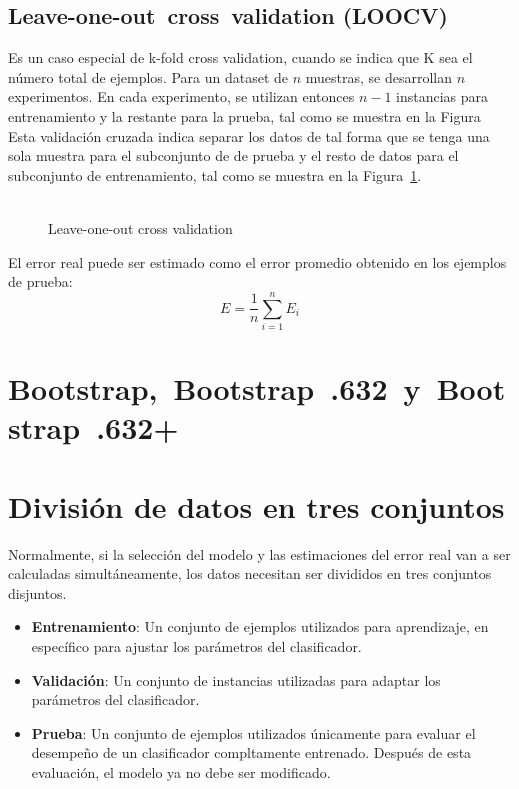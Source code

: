 \documentclass{article}
\begin{document}
\subsection{Leave-­one-out cross validation (LOOCV)}
Es un caso especial de k-fold cross validation, cuando se indica que K sea el número total de ejemplos.
Para un dataset de $n$ muestras, se desarrollan $n$ experimentos.
En cada experimento, se utilizan entonces $n-1$ instancias para entrenamiento y la restante para la prueba, tal como se muestra en la Figura 
Esta validación cruzada indica separar los datos de tal forma que se tenga una sola muestra para el subconjunto de de prueba y el resto de datos para el subconjunto de entrenamiento, tal como se muestra en la Figura~\ref{fig:leave-one-out-validation}.
\begin{figure}
	\centering
	\includegraphics[width=0.5]{resources/images/leave-one-out}
	\caption{Leave-one-out cross validation}
	\label{fig:leave-one-out-validation}
\end{figure}

El error real puede ser estimado como el error promedio obtenido en los ejemplos de prueba:
$$
	E = \frac{1}{n} \sum_{i=1}^n E_{i}
$$


\section{Bootstrap, Bootstrap .632 y Bootstrap .632+}

\section{División de datos en tres conjuntos}
Normalmente, si la selección del modelo y las estimaciones del error real van a ser calculadas simultáneamente, los datos necesitan ser divididos en tres conjuntos disjuntos.
\begin{itemize}
	\item \textbf{Entrenamiento}: Un conjunto de ejemplos utilizados para aprendizaje, en específico para ajustar los parámetros del clasificador.
	\item \textbf{Validación}: Un conjunto de instancias utilizadas para adaptar los parámetros del clasificador.
	\item \textbf{Prueba}: Un conjunto de ejemplos utilizados únicamente para evaluar el desempeño de un clasificador compltamente entrenado. Después de esta evaluación, el modelo ya no debe ser modificado.
\end{itemize}
\end{document}
